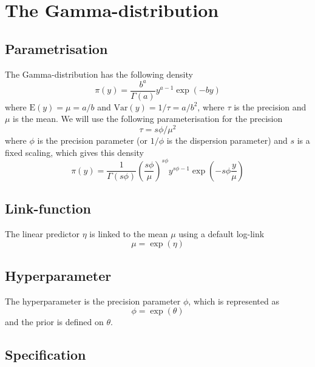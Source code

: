 \documentclass[a4paper,11pt]{article}
\begin{document}
\section*{The Gamma-distribution}

\subsection*{Parametrisation}

The Gamma-distribution has the following density
\begin{displaymath}
    \pi(y) = \frac{b^{a}}{\Gamma(a)} y^{a-1} \exp(-by)
\end{displaymath}
where $\text{E}(y) = \mu = a/b$ and $\text{Var}(y) = 1/\tau = a/b^{2}$,
where $\tau$ is the precision and $\mu$ is the mean. We will use the
following parameterisation for the precision
\begin{displaymath}
    \tau = s\phi / \mu^{2}
\end{displaymath}
where $\phi$ is the precision parameter (or $1/\phi$ is the dispersion
parameter) and $s$ is a fixed scaling, which gives this density
\begin{displaymath}
    \pi(y) = \frac{1}{\Gamma(s\phi)}
    \left(\frac{s\phi}{\mu}\right)^{s\phi}
    y^{s\phi -1} \exp\left(-s\phi \frac{y}{\mu}\right)
\end{displaymath}


\subsection*{Link-function}

The linear predictor $\eta$ is linked to the mean $\mu$ using a
default log-link
\begin{displaymath}
    \mu = \exp(\eta)
\end{displaymath}

\subsection*{Hyperparameter}

The hyperparameter is the precision parameter $\phi$, which is
represented as
\begin{displaymath}
    \phi = \exp(\theta)
\end{displaymath}
and the prior is defined on $\theta$.

\subsection*{Specification}
\end{document}
